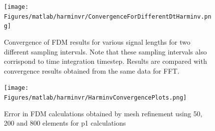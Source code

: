 % 

\begin{figure}
\texttt{[image: Figures/matlab/harminvr/ConvergenceForDifferentDtHarminv.png]}
\caption{Convergence of FDM results for various signal lengths for two different sampling intervals. Note that these sampling intervals also corrispond to time integration timestep. Results are compared with convergence results obtained from the same data for FFT.}
\label{HarmivSpectrum3}
\end{figure}

\begin{figure}
\texttt{[image: Figures/matlab/harminvr/HarminvConvergencePlots.png]}
\caption{Error in FDM calculations obtained by mesh refinement using 50, 200 and 800 elements for p1 calculations}
\label{HarmivSpectrum4}
\end{figure}






